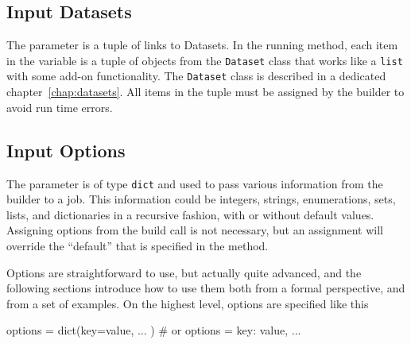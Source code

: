 \subsection*{Input Datasets}
The \datasets parameter is a tuple of links to Datasets.  In the
running method, each item in the \datasets variable is a tuple of
objects from the \texttt{Dataset} class that works like
a \texttt{list} with some add-on functionality.  The \texttt{Dataset}
class is described in a dedicated chapter~\ref{chap:datasets}.
All items in the \datasets tuple must be assigned by the builder to
avoid run time errors.




\subsection*{Input Options}

The \options parameter is of type \texttt{dict} and used to pass
various information from the builder to a job.  This information could
be integers, strings, enumerations, sets, lists, and dictionaries in a
recursive fashion, with or without default values.  Assigning options
from the build call is not necessary, but an assignment will override
the ``default'' that is specified in the method.

Options are straightforward to use, but actually quite advanced, and
the following sections introduce how to use them both from a formal
perspective, and from a set of examples.  On the highest level,
options are specified like this
\begin{python}
  options = dict(key=value, ... )  # or
  options = {key: value, ...}
\end{python}


